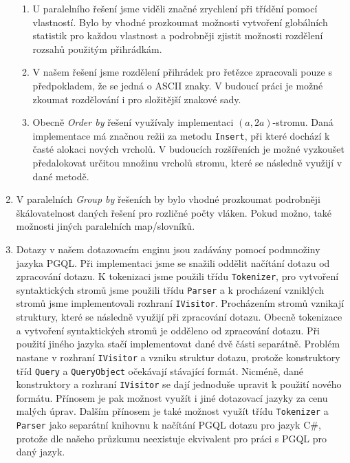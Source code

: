 \begin{enumerate}
\begin{enumerate}
\item
U paralelního řešení jsme viděli značné zrychlení při třídění pomocí vlastností.
Bylo by vhodné prozkoumat možnosti vytvoření globálních statistik pro každou vlastnost a podrobněji zjistit možnosti rozdělení rozsahů použitým přihrádkám.
\item
V našem řešení jsme rozdělení přihrádek pro řetězce zpracovali pouze s předpokladem, že se jedná o ASCII znaky.
V budoucí práci je možné zkoumat rozdělování i pro složitější znakové sady.
\item
Obecně \textit{Order by} řešení využívaly implementaci $(a, 2a)$-stromu.
Daná implementace má značnou režii za metodu \texttt{Insert}, při které dochází k časté alokaci nových vrcholů.
V budoucích rozšířeních je možné vyzkoušet předalokovat určitou množinu vrcholů stromu, které se následně využijí v dané metodě.
\end{enumerate}

\item V paralelních \textit{Group by} řešeních by bylo vhodné prozkoumat podrobněji škálovatelnost daných řešení pro rozličné počty vláken.
Pokud možno, také možnosti jiných paralelních map/slovníků.
 
\item
Dotazy v našem dotazovacím enginu jsou zadávány pomocí podmnožiny jazyka PGQL.
Při implementaci jsme se snažili oddělit načítání dotazu od zpracování dotazu.
K tokenizaci jsme použili třídu \texttt{Tokenizer}, pro vytvoření syntaktických stromů jsme použili třídu \texttt{Parser} a k procházení vzniklých stromů jsme implementovali rozhraní \texttt{IVisitor}.
Procházením stromů vznikají struktury, které se následně využijí při zpracování dotazu.
Obecně tokenizace a vytvoření syntaktických stromů je odděleno od zpracování dotazu.
Při použití jiného jazyka stačí implementovat dané dvě části separátně.
Problém nastane v rozhraní \texttt{IVisitor} a vzniku struktur dotazu, protože konstruktory tříd \texttt{Query} a \texttt{QueryObject} očekávají stávající formát.
Nicméně, dané konstruktory a rozhraní \texttt{IVisitor} se dají jednoduše upravit k použití nového formátu.
Přínosem je pak možnost využít i jiné dotazovací jazyky za cenu malých úprav.
Dalším přínosem je také možnost využít třídu \texttt{Tokenizer} a \texttt{Parser} jako separátní knihovnu k načítání PGQL dotazu pro jazyk C\#, protože dle našeho průzkumu neexistuje ekvivalent pro práci s PGQL pro daný jazyk. 

\end{enumerate}



